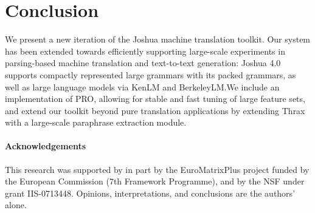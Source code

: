 \documentclass[11pt]{article}
\begin{document}
\section{Conclusion}

We present a new iteration of the Joshua machine translation
toolkit. Our system has been extended towards efficiently supporting
large-scale experiments in parsing-based machine translation and
text-to-text generation: Joshua 4.0 supports compactly represented
large grammars with its packed grammars, as well as large language
models via KenLM and BerkeleyLM.We include an implementation of PRO,
allowing for stable and fast tuning of large feature sets, and extend
our toolkit beyond pure translation applications by extending Thrax
with a large-scale paraphrase extraction module.

\paragraph{Acknowledgements}

This research was supported by in part by the EuroMatrixPlus project
funded by the European Commission (7th Framework Programme), and by
the NSF under grant IIS-0713448. Opinions, interpretations, and
conclusions are the authors' alone.



\end{document}
